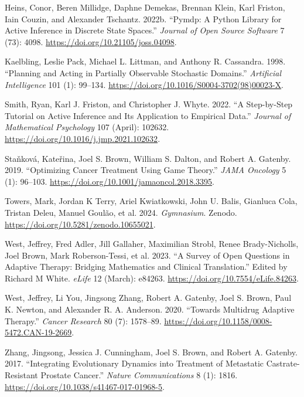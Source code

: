 \documentclass[
]{article}
\newlength{\cslhangindent}
\newenvironment{CSLReferences}[2] %
 {\begin{list}{}{%
  \setlength{\itemindent}{0pt}
  \setlength{\leftmargin}{0pt}
  \setlength{\parsep}{0pt}
  \ifodd #1
   \setlength{\leftmargin}{\cslhangindent}
   \setlength{\itemindent}{-1\cslhangindent}
  \fi
  \setlength{\itemsep}{#2\baselineskip}}}
 {\end{list}}
\begin{document}
\begin{CSLReferences}{1}{0}
Heins, Conor, Beren Millidge, Daphne Demekas, Brennan Klein, Karl
Friston, Iain Couzin, and Alexander Tschantz. 2022b. {``Pymdp: A Python
Library for Active Inference in Discrete State Spaces.''} \emph{Journal
of Open Source Software} 7 (73): 4098.
\url{https://doi.org/10.21105/joss.04098}.

Kaelbling, Leslie Pack, Michael L. Littman, and Anthony R. Cassandra.
1998. {``Planning and Acting in Partially Observable Stochastic
Domains.''} \emph{Artificial Intelligence} 101 (1): 99--134.
\url{https://doi.org/10.1016/S0004-3702(98)00023-X}.

Smith, Ryan, Karl J. Friston, and Christopher J. Whyte. 2022. {``A
Step-by-Step Tutorial on Active Inference and Its Application to
Empirical Data.''} \emph{Journal of Mathematical Psychology} 107
(April): 102632. \url{https://doi.org/10.1016/j.jmp.2021.102632}.

Staňková, Kateřina, Joel S. Brown, William S. Dalton, and Robert A.
Gatenby. 2019. {``Optimizing Cancer Treatment Using Game Theory.''}
\emph{JAMA Oncology} 5 (1): 96--103.
\url{https://doi.org/10.1001/jamaoncol.2018.3395}.

Towers, Mark, Jordan K Terry, Ariel Kwiatkowski, John U. Balis, Gianluca
Cola, Tristan Deleu, Manuel Goulão, et al. 2024. \emph{Gymnasium}.
Zenodo. \url{https://doi.org/10.5281/zenodo.10655021}.

West, Jeffrey, Fred Adler, Jill Gallaher, Maximilian Strobl, Renee
Brady-Nicholls, Joel Brown, Mark Roberson-Tessi, et al. 2023. {``A
Survey of Open Questions in Adaptive Therapy: Bridging Mathematics and
Clinical Translation.''} Edited by Richard M White. \emph{eLife} 12
(March): e84263. \url{https://doi.org/10.7554/eLife.84263}.

West, Jeffrey, Li You, Jingsong Zhang, Robert A. Gatenby, Joel S. Brown,
Paul K. Newton, and Alexander R. A. Anderson. 2020. {``Towards Multidrug
Adaptive Therapy.''} \emph{Cancer Research} 80 (7): 1578--89.
\url{https://doi.org/10.1158/0008-5472.CAN-19-2669}.

Zhang, Jingsong, Jessica J. Cunningham, Joel S. Brown, and Robert A.
Gatenby. 2017. {``Integrating Evolutionary Dynamics into Treatment of
Metastatic Castrate-Resistant Prostate Cancer.''} \emph{Nature
Communications} 8 (1): 1816.
\url{https://doi.org/10.1038/s41467-017-01968-5}.

\end{CSLReferences}
\end{document}

